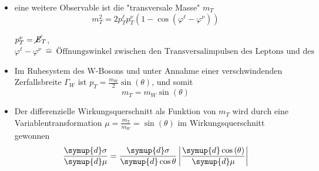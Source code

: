 \documentclass[aspectratio=1610, 9pt]{beamer}
\begin{document}
\begin{frame}
  \begin{itemize}
    \item eine weitere Observable ist die "transversale Masse" $m_T$
    \begin{equation*}
      m^2_T = 2 p^\ell_T p^\nu_T \left(1 - \cos{\left(\varphi^\ell-\varphi^\nu \right)} \right)
    \end{equation*}
    \begin{center}
      \small{$p^\nu_T = \cancel{\it{E}}_{T}$, $\varphi^\ell-\varphi^\nu \: \hat{=} \: \text{Öffnungswinkel zwischen den Transversalimpulsen des Leptons und des Neutrinos}$}
    \end{center}
    \item Im Ruhesystem des W-Bosons und unter Annahme einer verschwindenden Zerfallsbreite $\Gamma_W$ ist $p_T = \frac{m_W}{2} \sin{(\theta)}$, und somit
    \begin{equation*}
      m_T = m_W \sin{(\theta)}
    \end{equation*}
    \item Der differenzielle Wirkungsquerschnitt als Funktion von $m_T$ wird durch eine Variablentransformation $\mu = \frac{m_T}{m_W} = \sin{(\theta)}$ im Wirkungsquerschnitt gewonnen
    \begin{equation*}
      \frac{\symup{d}\sigma}{\symup{d}\mu} = \frac{\symup{d} \sigma}{\symup{d} \cos{\theta}} \left| \frac{\symup{d} \cos{(\theta)}}{\symup{d} \mu} \right|
    \end{equation*}
  \end{itemize}
\end{frame}
\end{document}
